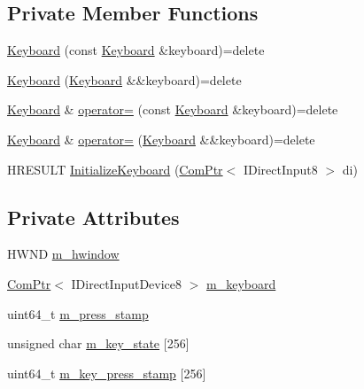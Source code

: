 \subsection*{Private Member Functions}
\begin{DoxyCompactItemize}
\item 
\hyperlink{classmage_1_1_keyboard_a39d07f8a5e37648ca9eba30aa55146bf}{Keyboard} (const \hyperlink{classmage_1_1_keyboard}{Keyboard} \&keyboard)=delete
\item 
\hyperlink{classmage_1_1_keyboard_a6ed1e7732253b4d7e4e0bf9ca5a6f108}{Keyboard} (\hyperlink{classmage_1_1_keyboard}{Keyboard} \&\&keyboard)=delete
\item 
\hyperlink{classmage_1_1_keyboard}{Keyboard} \& \hyperlink{classmage_1_1_keyboard_ae3ba98190c8c14ea894c676888825f35}{operator=} (const \hyperlink{classmage_1_1_keyboard}{Keyboard} \&keyboard)=delete
\item 
\hyperlink{classmage_1_1_keyboard}{Keyboard} \& \hyperlink{classmage_1_1_keyboard_a4f381bc90cc6828b4d0313999b544e6e}{operator=} (\hyperlink{classmage_1_1_keyboard}{Keyboard} \&\&keyboard)=delete
\item 
H\+R\+E\+S\+U\+LT \hyperlink{classmage_1_1_keyboard_a1d3211c7377529e570bb5cde900f73db}{Initialize\+Keyboard} (\hyperlink{namespacemage_ae74f374780900893caa5555d1031fd79}{Com\+Ptr}$<$ I\+Direct\+Input8 $>$ di)
\end{DoxyCompactItemize}
\subsection*{Private Attributes}
\begin{DoxyCompactItemize}
\item 
H\+W\+ND \hyperlink{classmage_1_1_keyboard_aa7196c689dad6f5aaf35e3929de02791}{m\+\_\+hwindow}
\item 
\hyperlink{namespacemage_ae74f374780900893caa5555d1031fd79}{Com\+Ptr}$<$ I\+Direct\+Input\+Device8 $>$ \hyperlink{classmage_1_1_keyboard_a992b8b8caf0d858163e5e9af04302324}{m\+\_\+keyboard}
\item 
uint64\+\_\+t \hyperlink{classmage_1_1_keyboard_a2c638a93d1f61d9d3578a0df8b6a1c39}{m\+\_\+press\+\_\+stamp}
\item 
unsigned char \hyperlink{classmage_1_1_keyboard_a7499df459499f5addd50507ea1e2358c}{m\+\_\+key\+\_\+state} \mbox{[}256\mbox{]}
\item 
uint64\+\_\+t \hyperlink{classmage_1_1_keyboard_a8eb4ce7e4e2395bb27d2ac9236655335}{m\+\_\+key\+\_\+press\+\_\+stamp} \mbox{[}256\mbox{]}
\end{DoxyCompactItemize}
